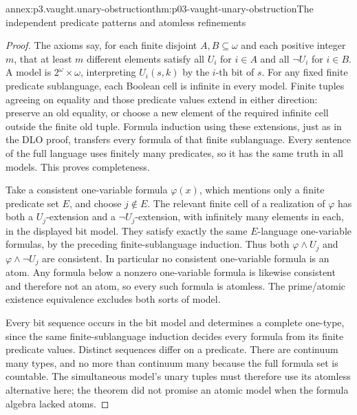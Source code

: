 \begin{annexitem}{annex:p3.vaught.unary-obstruction}{thm:p03-vaught-unary-obstruction}{The independent predicate patterns and atomless refinements}
\begin{proof}
The axioms say, for each finite disjoint \(A,B\subseteq\omega\)
and each positive integer \(m\), that at least \(m\) different
elements satisfy all \(U_i\) for \(i\in A\) and all \(\neg U_i\)
for \(i\in B\).
A model is \(2^\omega\times\omega\), interpreting \(U_i(s,k)\)
by the \(i\)-th bit of \(s\).
For any fixed finite predicate sublanguage, each Boolean cell
is infinite in every model.
Finite tuples agreeing on equality and those predicate values
extend in either direction: preserve an old equality, or choose
a new element of the required infinite cell outside the finite
old tuple. Formula induction using these extensions, just as in
the DLO proof, transfers every formula of that finite sublanguage.
Every sentence of the full language uses finitely many predicates,
so it has the same truth in all models. This proves completeness.

Take a consistent one-variable formula \(\varphi(x)\), which
mentions only a finite predicate set \(E\), and choose \(j\notin E\).
The relevant finite cell of a realization of \(\varphi\) has
both a \(U_j\)-extension and a \(\neg U_j\)-extension, with infinitely
many elements in each, in the displayed bit model.
They satisfy exactly the same \(E\)-language one-variable formulas,
by the preceding finite-sublanguage induction.
Thus both \(\varphi\land U_j\) and
\(\varphi\land\neg U_j\) are consistent.
In particular no consistent one-variable formula is an atom.
Any formula below a nonzero one-variable formula is likewise
consistent and therefore not an atom, so every such formula is
atomless. The prime/atomic existence equivalence excludes both
sorts of model.

Every bit sequence occurs in the bit model and determines a
complete one-type, since the same finite-sublanguage induction
decides every formula from its finite predicate values.
Distinct sequences differ on a predicate. There are continuum
many types, and no more than continuum many because the full
formula set is countable.
The simultaneous model's unary tuples must therefore use its
atomless alternative here; the theorem did not promise an
atomic model when the formula algebra lacked atoms.
\end{proof}
\end{annexitem}

